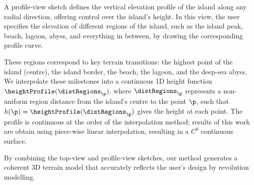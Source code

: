 
A profile-view sketch defines the vertical elevation profile of the island along any radial direction, offering control over the island's height. In this view, the user specifies the elevation of different regions of the island, such as the island peak, beach, lagoon, abyss, and everything in between, by drawing the corresponding profile curve.

These regions correspond to key terrain transitions: the highest point of the island (centre), the island border, the beach, the lagoon, and the deep-sea abyss. We interpolate these milestones into a continuous 1D height function $\heightProfile(\distRegions_\p)$, where $\distRegions_\p$ represents a non-uniform region distance from the island's centre to the point $\p$, such that $h(\p) = \heightProfile(\distRegions_\p)$ gives the height at each point. The profile is continuous at the order of the interpolation method; results of this work are obtain using piece-wise linear interpolation, resulting in a $C^0$ continuous surface.

By combining the top-view and profile-view sketches, our method generates a coherent 3D terrain model that accurately reflects the user's design by revolution modelling.



